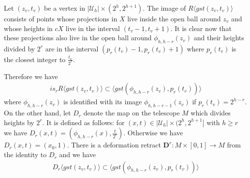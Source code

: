 \documentclass[a4paper,11pt]{article}
\theoremstyle{definition}
\theoremstyle{plain}
\theoremstyle{remark}
\begin{document}
{Let $(z_{v},t_{v})$ be a vertex in $|\mathcal{U}_{h}| \times (2^{h},2^{h+1})$. The image of $R \langle gst(z_{v}, t_{v})\rangle$ consists of points whose projections in $X$ live inside the open ball around $z_{v}$ and whose heights in $cX$ live in the interval $(t_{v}-1,t_{v}+1)$. It is clear now that these projections also live in the open ball around $\phi_{h,h-r}(z_{v})$ and their heights divided by $2^{r}$ are in the interval $(p_{r}(t_{v})-1,p_{r}(t_{v})+1)$ where $p_{r}(t_{v})$ is the closest integer to $\frac{t_{v}}{2^r}$.

Therefore we have
\begin{align*}
is_{r}R \langle gst(z_v,t_v) \rangle \subset \langle gst(\phi_{h,h-r}(z_v),p_{r}(t_v)) \rangle 
\end{align*}  
where $\phi_{h,h-r}(z_v)$ is identified with its image $\phi_{h,h-r-1}(z_v)$ if $p_{r}(t_v) = 2^{h-r}$. \\

On the other hand, let $D_{r}$ denote the map on the telescope $M$ which divides heights by $2^{r}$. It is defined as follows: for $(x,t)\in |\mathcal{U}_{h}| \times (2^h,2^{h+1}]$ with $h\geq r$ we have $D_{r}(x,t) =  (\phi_{h,h-r}(x),\frac{t}{2^{r}})$. Otherwise we have $D_{r}(x,t) = (x_0,1)$. There is a deformation retract $\mathbf{D}^{r}: M\times [0,1]\rightarrow M$ from the identity to $D_{r}$ and we have 
\begin{align*}
D_{r}\langle gst(z_{v},t_{v})\rangle \subset \langle gst(\phi_{h,h-r}(z_{v}),p_{r}(t_{v})) \rangle  
\end{align*}

}
\end{document}

